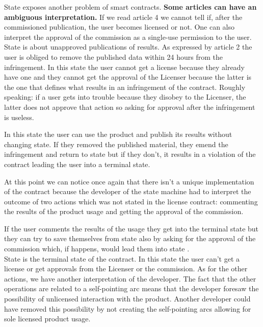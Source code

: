 \documentclass{scrbook}
\newcommand*\circled[1]{\tikz[baseline=(char.base)]{
            \node[shape=circle,draw,inner sep=2pt] (char) {#1};}}
\begin{document}
State \circled{4} exposes another problem of smart contracts. \textbf{Some articles can have an ambiguous interpretation.} If we read article 4 we cannot tell if, after the commissioned publication, the user becomes licensed or not. One can also interpret the approval of the commission as a single-use permission to the user. \\

State \circled{5} is about unapproved publications of results. As expressed by article 2 the user is obliged to remove the published data within 24 hours from the infringement. In this state the user cannot get a license because they already have one and they cannot get the approval of the Licenser because the latter is the one that defines what results in an infringement of the contract. Roughly speaking: if a user gets into trouble because they disobey to the Licenser, the latter does not approve that action so asking for approval after the infringement is useless.

In this state the user can use the product and publish its results without changing state. If they removed the published material, they emend the infringement and return to state \circled{2} but if they don't, it results in a violation of the contract leading the user into a terminal state.

At this point we can notice once again that there isn't a unique implementation of the contract because the developer of the state machine had to interpret the outcome of two actions which was not stated in the license contract: commenting the results of the product usage and getting the approval of the commission.

If the user comments the results of the usage they get into the terminal state but they can try to save themselves from state \circled{5} also by asking for the approval of the commission which, if happens, would lead them into state \circled{4}. \\

State \circled{6} is the terminal state of the contract. In this state the user can't get a license or get approvals from the Licenser or the commission. As for the other actions, we have another interpretation of the developer. The fact that the other operations are related to a self-pointing arc means that the developer foresaw the possibility of unlicensed interaction with the product. Another developer could have removed this possibility by not creating the self-pointing arcs allowing for sole licensed product usage. \\
\end{document}
